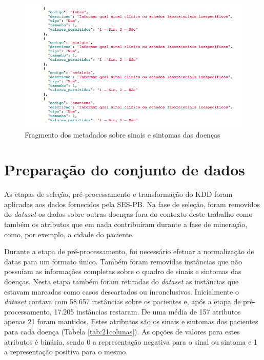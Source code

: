 \begin{figure}[htb]
  \caption{\label{fig:metadados}Fragmento dos metadados sobre sinais e sintomas das doenças}
  \begin{center}
    \includegraphics[width=\textwidth]{imagens/fragmentodosmetadados.png}
  \end{center}
\end{figure}
\newpage

\section{Preparação do conjunto de dados}

As etapas de seleção, pré-processamento e transformação do KDD foram aplicadas aos dados fornecidos pela SES-PB. Na fase de seleção, foram removidos do \textit{dataset} os dados sobre outras doenças fora do contexto deste trabalho como também os atributos que em nada contribuíram durante a fase de mineração, como, por exemplo, a cidade do paciente.

Durante a etapa de pré-processamento, foi necessário efetuar a normalização de datas para um formato único. Também foram removidas instâncias que não possuíam as informações completas sobre o quadro de sinais e sintomas das doenças. Nesta etapa também foram retiradas do \textit{dataset} as instâncias que estavam marcadas como casos descartados ou inconclusivos. Inicialmente o \textit{dataset} contava com 58.657 instâncias sobre os pacientes e, após a etapa de pré-processamento, 17.205 instâncias restaram. De uma média de 157 atributos apenas 21 foram mantidos. Estes atributos são os sinais e sintomas dos pacientes para cada doença (Tabela \ref{tab:21colunas}). As opções de valores para estes atributos é binária, sendo 0 a representação negativa para o sinal ou sintoma e 1 a representação positiva para o mesmo.

